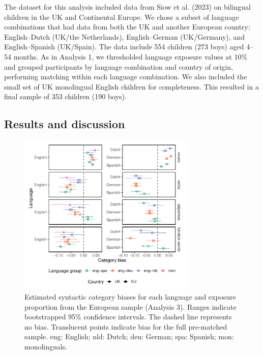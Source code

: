\documentclass[10pt, letterpaper]{article}
\begin{document}
The dataset for this analysis included data from Siow et al. (2023) on
bilingual children in the UK and Continental Europe. We chose a subset
of language combinations that had data from both the UK and another
European country: English--Dutch (UK/the Netherlands), English--German
(UK/Germany), and English--Spanish (UK/Spain). The data include 554
children (273 boys) aged 4--54 months. As in Analysis 1, we thresholded
language exposure values at 10\% and grouped participants by language
combination and country of origin, performing matching within each
language combination. We also included the small set of UK monolingual
English children for completeness. This resulted in a final sample of
353 children (190 boys).

\subsection{Results and discussion}\label{results-and-discussion-2}

\begin{CodeChunk}
\begin{figure}[t]

{\centering \includegraphics[width=240pt]{figs/ox_bias-1} 

}

\caption[Estimated syntactic category biases for each language and exposure proportion from the European sample (Analysis 3)]{Estimated syntactic category biases for each language and exposure proportion from the European sample (Analysis 3). Ranges indicate bootstrapped 95\% confidence intervals. The dashed line represents no bias. Translucent points indicate bias for the full pre-matched sample. eng: English; nld: Dutch; deu: German; spa: Spanish; mon: monolinguals.}\label{fig:ox_bias}
\end{figure}
\end{CodeChunk}
\end{document}
